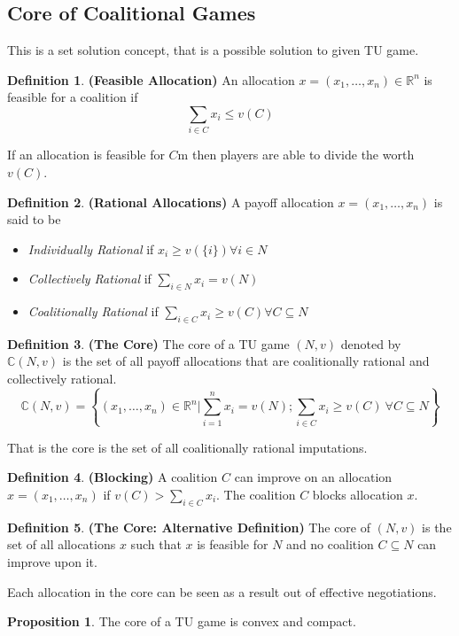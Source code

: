 \documentclass{article}
\theoremstyle{definition}
\newtheorem{defn}{Definition}[section]
\newtheorem{prop}{Proposition}[section]
\begin{document}
\subsection{Core of Coalitional Games}
This is a set solution concept, that is a possible solution to given TU game.
\begin{defn}
\textbf{(Feasible Allocation)} An allocation $x = (x_1,\dots,x_n) \in \mathbb{R}^n$ is feasible for a coalition if $$\sum_{i \in C}x_i \leq v(C)$$
\end{defn}
If an allocation is feasible for $C$m then players are able to divide the worth $v(C)$.
\begin{defn}
\textbf{(Rational Allocations)} A payoff allocation $x = (x_1,\dots,x_n)$ is said to be
\begin{itemize}
	\item \textit{Individually Rational} if $x_i \geq v(\{i\}) \forall i \in N$
	\item \textit{Collectively Rational} if $\sum_{i\in N} x_i = v(N)$
	\item \textit{Coalitionally Rational} if $\sum_{i \in C} x_i \geq v(C) \forall C \subseteq N$
\end{itemize}
\end{defn}
\begin{defn}
\textbf{(The Core)} The core of a TU game $(N,v)$ denoted by $\mathbb{C}(N,v)$ is the set of all payoff allocations that are coalitionally rational and collectively rational. $$\mathbb{C}(N,v) = \left\{(x_1,\dots,x_n) \in \mathbb{R}^n | \sum_{i=1}^n x_i = v(N); \sum_{i \in C}x_i \geq v(C)~\forall C\subseteq N\right\}$$
\end{defn}
That is the core is the set of all coalitionally rational imputations.
\begin{defn}
\textbf{(Blocking)} A coalition $C$ can improve on an allocation $x = (x_1,\dots,x_n)$ if $v(C) > \sum_{i \in C} x_i$. The coalition $C$ blocks allocation $x$.
\end{defn}
\begin{defn}
\textbf{(The Core: Alternative Definition)} The core of $(N,v)$ is the set of all allocations $x$ such that $x$ is feasible for $N$ and no coalition $C \subseteq N$ can improve upon it.
\end{defn}
Each allocation in the core can be seen as a result out of effective negotiations.
\begin{prop}
The core of a TU game is convex and compact.
\end{prop}
\end{document}
